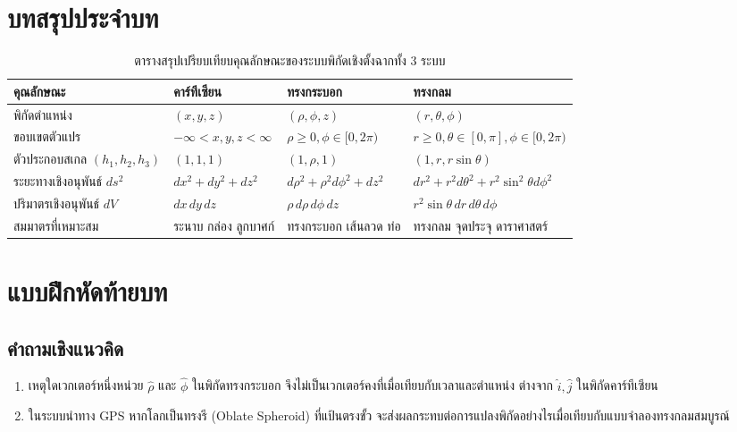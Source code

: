 \section{บทสรุปประจำบท}
\begin{table}[H]
    \centering
    \caption{ตารางสรุปเปรียบเทียบคุณลักษณะของระบบพิกัดเชิงตั้งฉากทั้ง 3 ระบบ}
    \label{tab:coords_master_summary}
    \begin{tabularx}{\textwidth}{p{3.2cm}YYY}
        \toprule
        \textbf{คุณลักษณะ} & \textbf{คาร์ทีเซียน} & \textbf{ทรงกระบอก} & \textbf{ทรงกลม} \\
        \midrule
        พิกัดตำแหน่ง & $(x, y, z)$ & $(\rho, \phi, z)$ & $(r, \theta, \phi)$ \\
        ขอบเขตตัวแปร & $-\infty < x,y,z < \infty$ & $\rho \ge 0, \phi \in [0, 2\pi)$ & $r \ge 0, \theta \in [0, \pi], \phi \in [0, 2\pi)$ \\
        ตัวประกอบสเกล $(h_1, h_2, h_3)$ & $(1, 1, 1)$ & $(1, \rho, 1)$ & $(1, r, r\sin\theta)$ \\
        ระยะทางเชิงอนุพันธ์ $ds^2$ & $dx^2 + dy^2 + dz^2$ & $d\rho^2 + \rho^2 d\phi^2 + dz^2$ & $dr^2 + r^2 d\theta^2 + r^2\sin^2\theta d\phi^2$ \\
        ปริมาตรเชิงอนุพันธ์ $dV$ & $dx\,dy\,dz$ & $\rho\,d\rho\,d\phi\,dz$ & $r^2\sin\theta\,dr\,d\theta\,d\phi$ \\
        สมมาตรที่เหมาะสม & ระนาบ กล่อง ลูกบาศก์ & ทรงกระบอก เส้นลวด ท่อ & ทรงกลม จุดประจุ ดาราศาสตร์ \\
        \bottomrule
    \end{tabularx}
\end{table}

\clearpage
\section{แบบฝึกหัดท้ายบท}
\subsection{คำถามเชิงแนวคิด}
\begin{enumerate}
    \item เหตุใดเวกเตอร์หนึ่งหน่วย $\hat{\rho}$ และ $\hat{\phi}$ ในพิกัดทรงกระบอก จึงไม่เป็นเวกเตอร์คงที่เมื่อเทียบกับเวลาและตำแหน่ง ต่างจาก $\hat{i}, \hat{j}$ ในพิกัดคาร์ทีเซียน
    \item ในระบบนำทาง GPS หากโลกเป็นทรงรี (Oblate Spheroid) ที่แป้นตรงขั้ว จะส่งผลกระทบต่อการแปลงพิกัดอย่างไรเมื่อเทียบกับแบบจำลองทรงกลมสมบูรณ์
\end{enumerate}

